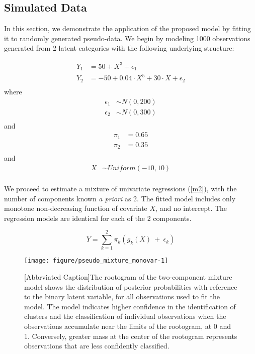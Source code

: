\documentclass[10pt]{olplainarticle}\usepackage[]{graphicx}\usepackage[]{color}
\makeatletter
\def\maxwidth{ %
  \ifdim\Gin@nat@width>\linewidth
    \linewidth
  \else
    \Gin@nat@width
  \fi
}
\newenvironment{knitrout}{}{} %
\makeatother
\begin{document}
\subsection{Simulated Data}

In this section, we demonstrate the application of the proposed model by fitting it to randomly generated pseudo-data. We begin by modeling 1000 observations generated from 2 latent categories with the following underlying structure:

\begin{align*}
  Y_{1} &= 50 + X^3 + \epsilon_1 \\
  Y_{2} &= -50 + 0.04 \cdot X^5 + 30 \cdot X + \epsilon_2 \\
\end{align*}
where 
\begin{align*}
  \epsilon_1 &\sim N(0,200) \\
  \epsilon_2 &\sim N(0,300) \\
\end{align*}
and
\begin{align*}
  \pi_1 &= 0.65 \\
  \pi_2 &= 0.35 \\
\end{align*}
and
\begin{align*}
  X &\sim Uniform(-10,10) \\
\end{align*}


We proceed to estimate a mixture of univariate regressions (\ref{m2}), with the number of components known \emph{a priori} as 2. The fitted model includes only monotone non-decreasing function of covariate $X$, and no intercept. The regression models are identical for each of the 2 components.

\begin{equation} \label{m2}
  Y = \sum_{k=1}^{2}\pi_k (g_{k} (X) \ +\  \epsilon_k)
\end{equation}

\begin{figure}[H]
\begin{knitrout}
\color{fgcolor}

{\centering \texttt{[image: figure/pseudo\_mixture\_monovar-1]} 

}



\end{knitrout}
[Abbrviated Caption]{The rootogram of the two-component mixture model shows the distribution of posterior probabilities with reference to the binary latent variable, for all observations used to fit the model. The model indicates higher confidence in the identification of clusters and the classification of individual observations when the observations accumulate near the limits of the rootogram, at 0 and 1. Conversely, greater mass at the center of the rootogram represents observations that are less confidently classified.}
\end{figure}
\end{document}
